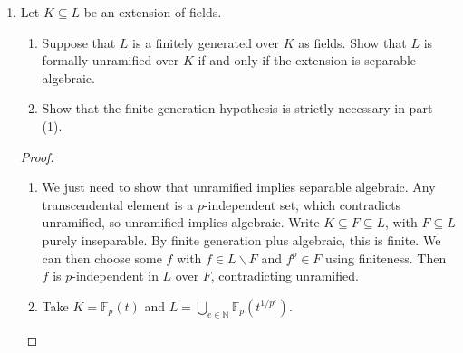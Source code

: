 \documentclass{amsart}[12pt]
\newcommand{\F}{\mathbb{F}}
\newcommand{\N}{\mathbb{N}}
\numberwithin{equation}{section}
\theoremstyle{plain} %
\theoremstyle{definition}
\theoremstyle{remark}
\begin{document}
\begin{enumerate}
\





\item Let $K\subseteq L$ be an extension of fields.
\begin{enumerate}
\item Suppose that $L$ is a finitely generated over $K$ as fields. Show that $L$ is formally unramified over $K$ if and only if the extension is separable algebraic.
\item Show that the finite generation hypothesis is strictly necessary in part (1).
\end{enumerate}

\begin{proof} 
\begin{enumerate}
\item We just need to show that unramified implies separable algebraic. Any transcendental element is a $p$-independent set, which contradicts unramified, so unramified implies algebraic. Write $K\subseteq F \subseteq L$, with $F\subseteq L$ purely inseparable. By finite generation plus algebraic, this is finite. We can then choose some $f$ with $f\in L \smallsetminus F$ and $f^p\in F$ using finiteness. Then $f$ is $p$-independent in $L$ over $F$, contradicting unramified.
\item Take $K=\F_p(t)$ and $L=\bigcup_{e\in \N} \F_p(t^{1/p^{e}})$.
\end{enumerate}
\end{proof}


\end{enumerate}
\end{document}
